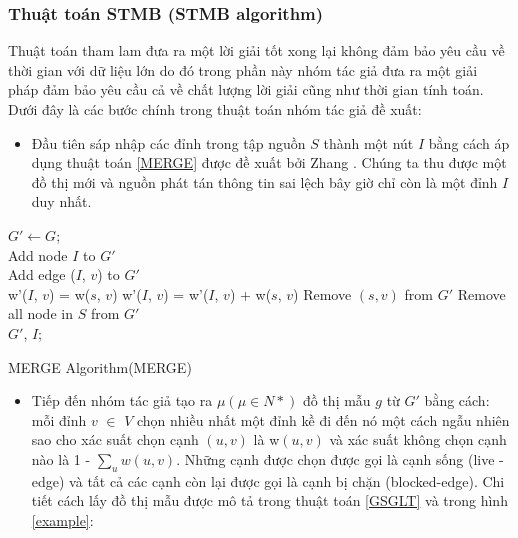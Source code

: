 \subsubsection{Thuật toán STMB (STMB algorithm)}
Thuật toán tham lam đưa ra một lời giải tốt xong lại không đảm bảo yêu cầu về thời gian với dữ liệu lớn do đó trong phần này nhóm tác giả đưa ra một giải pháp đảm bảo yêu cầu cả về chất lượng lời giải cũng như thời gian tính toán. Dưới đây là các bước chính trong thuật toán nhóm tác giả đề xuất:
\begin {itemize}
\item Đầu tiên sáp nhập các đỉnh trong tập nguồn $S$ thành một nút $I$ bằng cách áp dụng thuật toán \ref{MERGE} được đề xuất bởi Zhang \cite{yao16}. Chúng ta thu được một đồ thị mới và nguồn phát tán thông tin sai lệch bây giờ chỉ còn là một đỉnh $I$ duy nhất.
\end{itemize}
\begin{algorithm}[H]			
$G' \leftarrow G$;
\\
Add node $I$ to $G'$			
\\
{
	{
		{
			Add edge ($I$, $v$) to $G'$
			\\
			w'($I$, $v$) = w($s$, $v$)
		}
		{
			w'($I$, $v$) = w'($I$, $v$) + w($s$, $v$)
		}
		Remove $(s,v)$ from $G'$
	}
}
Remove all node in $S$ from $G'$
\\
\Return $G'$, $I$;
\caption{MERGE Algorithm(MERGE)}
\label{MERGE}
\end{algorithm}	
\begin {itemize}			
\item Tiếp đến nhóm tác giả tạo ra $\mu(\mu \in N*)$ đồ thị mẫu $g$ từ $G'$ bằng cách: mỗi đỉnh $v$ $\in$ $V$ chọn nhiều nhất một đỉnh kề đi đến nó một cách ngẫu nhiên sao cho xác suất chọn cạnh $(u, v)$ là w$(u, v)$ và xác suất không chọn cạnh nào là 1 - $\sum_{u} w(u, v)$. Những cạnh được chọn được gọi là cạnh sống  (live - edge) và tất cả các cạnh còn lại được gọi là cạnh bị chặn (blocked-edge). Chi tiết cách lấy đồ thị mẫu được mô tả trong thuật toán \ref{GSGLT} và trong hình \ref{example}: 
\end {itemize}
